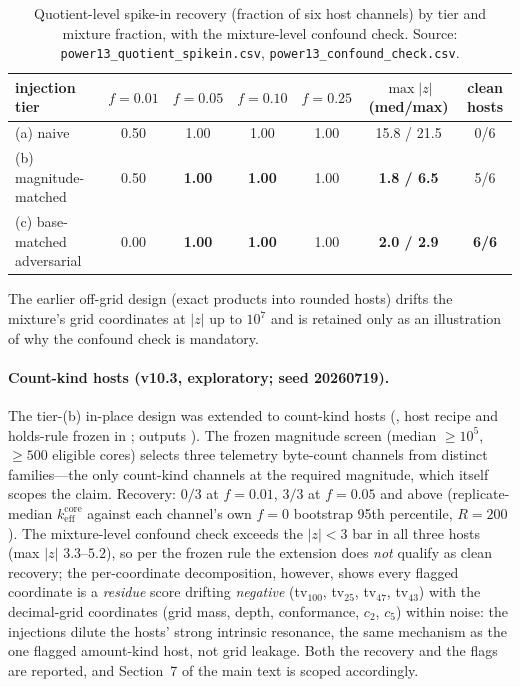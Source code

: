 \documentclass[12pt]{article}
\newcommand{\keff}{k_{\mathrm{eff}}}
\begin{document}
\begin{table}[t]
\centering
\caption{Quotient-level spike-in recovery (fraction of six host channels) by
tier and mixture fraction, with the mixture-level confound check. Source:
\texttt{power13\_quotient\_spikein.csv}, \texttt{power13\_confound\_check.csv}.}
\label{tab:spikein}
\footnotesize
\setlength{\tabcolsep}{4pt}
\begin{tabular}{lcccccc}
\toprule
injection tier & $f{=}0.01$ & $f{=}0.05$ & $f{=}0.10$ & $f{=}0.25$ & $\max|z|$ (med/max) & clean hosts \\
\midrule
(a) naive & 0.50 & 1.00 & 1.00 & 1.00 & 15.8 / 21.5 & 0/6 \\
(b) magnitude-matched & 0.50 & \textbf{1.00} & \textbf{1.00} & 1.00 & \textbf{1.8 / 6.5} & 5/6 \\
(c) base-matched adversarial & 0.00 & \textbf{1.00} & \textbf{1.00} & 1.00 & \textbf{2.0 / 2.9} & \textbf{6/6} \\
\bottomrule
\end{tabular}
\end{table}

The earlier off-grid design (exact products into rounded hosts) drifts the
mixture's grid coordinates at $|z|$ up to $10^7$ and is retained only as an
illustration of why the confound check is mandatory.

\paragraph{Count-kind hosts (v10.3, exploratory; seed 20260719).}
The tier-(b) in-place design was extended to count-kind hosts
(, host recipe and holds-rule frozen in
; outputs ). The
frozen magnitude screen (median $\ge 10^5$, $\ge 500$ eligible cores)
selects three telemetry byte-count channels from distinct families---the
only count-kind channels at the required magnitude, which itself scopes the
claim. Recovery: $0/3$ at $f = 0.01$, $3/3$ at $f = 0.05$ and above
(replicate-median $\keff^{\mathrm{core}}$ against each channel's own
$f{=}0$ bootstrap 95th percentile, $R = 200$). The mixture-level confound
check exceeds the $|z| < 3$ bar in all three hosts (max $|z|$ $3.3$--$5.2$),
so per the frozen rule the extension does \emph{not} qualify as clean
recovery; the per-coordinate decomposition, however, shows every flagged
coordinate is a \emph{residue} score drifting \emph{negative}
(tv$_{100}$, tv$_{25}$, tv$_{47}$, tv$_{43}$) with the decimal-grid
coordinates (grid mass, depth, conformance, $c_2$, $c_5$) within noise: the
injections dilute the hosts' strong intrinsic resonance, the same mechanism
as the one flagged amount-kind host, not grid leakage. Both the recovery and
the flags are reported, and Section~7 of the main text is scoped
accordingly.
\end{document}
